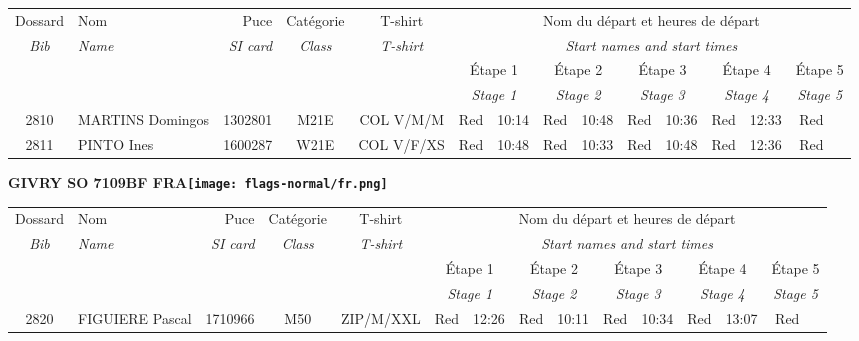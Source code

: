 \documentclass{report}
\begin{document}
  \begin{longtable}{|c|l|r|c|c|*{5}{cc|}}
    Dossard & Nom  & Puce    & Catégorie & T-shirt & \multicolumn{10}{c|}{Nom du départ et heures de départ} \\
    \itshape Bib     & \itshape Name & \itshape SI card & \itshape Class  & \itshape  T-shirt  & \multicolumn{10}{c|}{\itshape Start names and start times} \\
    \hline
    & & & & & \multicolumn{2}{c|}{Étape 1} & \multicolumn{2}{c|}{Étape 2} & \multicolumn{2}{c|}{Étape 3} & \multicolumn{2}{c|}{Étape 4} & \multicolumn{2}{c|}{Étape 5} \\
    & & & & & \multicolumn{2}{c|}{\itshape Stage 1} & \multicolumn{2}{c|}{\itshape Stage 2} & \multicolumn{2}{c|}{\itshape Stage 3} & \multicolumn{2}{c|}{\itshape Stage 4} & \multicolumn{2}{c|}{\itshape Stage 5} \\
    \hline
    2810 & MARTINS Domingos & 1302801 & M21E & COL V/M/M & Red & 10:14 & Red & 10:48 & Red & 10:36 & Red & 12:33 & Red &  \\
    2811 & PINTO Ines & 1600287 & W21E & COL V/F/XS & Red & 10:48 & Red & 10:33 & Red & 10:48 & Red & 12:36 & Red &  \\
  \end{longtable}
\newpage
  \Huge \centering \bfseries GIVRY SO 7109BF FRA\normalfont \footnotesize \sffamily \hfill \texttt{[image: flags-normal/fr.png]} \newline 
  \begin{longtable}{|c|l|r|c|c|*{5}{cc|}}
    Dossard & Nom  & Puce    & Catégorie & T-shirt & \multicolumn{10}{c|}{Nom du départ et heures de départ} \\
    \itshape Bib     & \itshape Name & \itshape SI card & \itshape Class  & \itshape  T-shirt  & \multicolumn{10}{c|}{\itshape Start names and start times} \\
    \hline
    & & & & & \multicolumn{2}{c|}{Étape 1} & \multicolumn{2}{c|}{Étape 2} & \multicolumn{2}{c|}{Étape 3} & \multicolumn{2}{c|}{Étape 4} & \multicolumn{2}{c|}{Étape 5} \\
    & & & & & \multicolumn{2}{c|}{\itshape Stage 1} & \multicolumn{2}{c|}{\itshape Stage 2} & \multicolumn{2}{c|}{\itshape Stage 3} & \multicolumn{2}{c|}{\itshape Stage 4} & \multicolumn{2}{c|}{\itshape Stage 5} \\
    \hline
    2820 & FIGUIERE Pascal & 1710966 & M50 & ZIP/M/XXL & Red & 12:26 & Red & 10:11 & Red & 10:34 & Red & 13:07 & Red &  \\
  \end{longtable}
\end{document}
